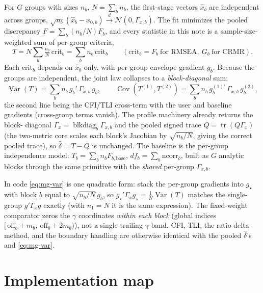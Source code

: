 \documentclass[11pt]{article}
\newcommand{\tr}{\operatorname{tr}}
\newcommand{\Var}{\operatorname{Var}}
\newcommand{\Cov}{\operatorname{Cov}}
\newcommand{\dto}{\xrightarrow{d}}
\theoremstyle{plain}
\theoremstyle{remark}
\begin{document}
For $G$ groups with sizes $n_b$, $N=\sum_b n_b$, the first-stage vectors
$\hat x_b$ are independent across groups, $\sqrt{n_b}(\hat x_b-x_{0,b})\dto
\mathcal N(0,\Gamma_{x,b})$. The fit minimizes the pooled discrepancy
$F=\sum_b (n_b/N)F_b$, and every statistic in this note is a sample-size-weighted
sum of per-group criteria,
\begin{equation}\label{eq:mg-stat}
  T=N\!\sum_b \tfrac{n_b}{N}\,\mathrm{crit}_b=\sum_b n_b\,\mathrm{crit}_b
  \qquad(\mathrm{crit}_b=F_b\ \text{for RMSEA},\ G_b\ \text{for CRMR}).
\end{equation}
Each $\mathrm{crit}_b$ depends on $\hat x_b$ only, with per-group envelope
gradient $g_b$. Because the groups are independent, the joint law collapses to a
\emph{block-diagonal} sum:
\begin{equation}\label{eq:mg-var}
  \Var(T)=\sum_b n_b\,g_b'\,\Gamma_{x,b}\,g_b,\qquad
  \Cov(T^{(1)},T^{(2)})=\sum_b n_b\,g_{b}^{(1)\prime}\,\Gamma_{x,b}\,g_{b}^{(2)},
\end{equation}
the second line being the CFI/TLI cross-term with the user and baseline gradients
(cross-group terms vanish). The profile machinery already returns the block-%
diagonal $\Gamma_x=\operatorname{blkdiag}_b\Gamma_{x,b}$ and the pooled signed
trace $\bar Q=\tr(Q\Gamma_x)$ (the two-metric core scales each block's Jacobian by
$\sqrt{n_b/N}$, giving the correct pooled trace), so $\hat\delta=T-\bar Q$ is
unchanged. The baseline is the per-group independence model: $T_b=\sum_b n_b
F_{b,\mathrm{base}}$, $df_b=\sum_b \mathrm{ncorr}_b$, built as $G$ analytic blocks
through the same primitive with the \emph{shared} per-group $\Gamma_{x,b}$.

In code \eqref{eq:mg-var} is one quadratic form: stack the per-group gradients
into $g_\star$ with block $b$ equal to $\sqrt{n_b/N}\,g_b$, so
$g_\star'\Gamma_x g_\star=\frac1N\Var(T)$ matches the single-group
$g'\Gamma_x g$ exactly (with $n_1=N$ it is the same expression). The
fixed-weight comparator zeros the $\gamma$ coordinates \emph{within each block}
(global indices $[\,\mathrm{off}_b+m_b,\ \mathrm{off}_b+2m_b)$), not a single
trailing $\gamma$ band. CFI, TLI, the ratio delta-method, and the boundary
handling are otherwise identical with the pooled $\hat\delta$'s and
\eqref{eq:mg-var}.

\section{Implementation map}\label{sec:impl}
\end{document}
